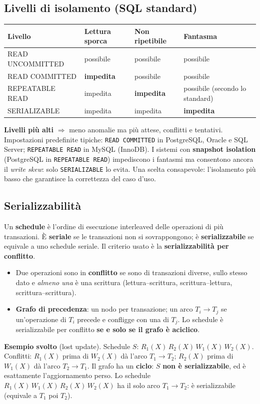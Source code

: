 \subsection{Livelli di isolamento (SQL standard)}
\begin{center}
\small
\begin{tabularx}{\textwidth}{@{}>{\raggedright\arraybackslash}p{3.5cm}XXX@{}}
\toprule
\textbf{Livello} & \textbf{Lettura sporca} & \textbf{Non ripetibile} & \textbf{Fantasma} \\
\midrule
READ UNCOMMITTED & possibile & possibile & possibile \\
READ COMMITTED & \textbf{impedita} & possibile & possibile \\
REPEATABLE READ & impedita & \textbf{impedita} & possibile (secondo lo standard) \\
SERIALIZABLE & impedita & impedita & \textbf{impedita} \\
\bottomrule
\end{tabularx}
\end{center}
\textbf{Livelli più alti} $\Rightarrow$ meno anomalie ma più attese, conflitti e tentativi. Impostazioni predefinite tipiche: \texttt{READ COMMITTED} in PostgreSQL, Oracle e SQL Server; \texttt{REPEATABLE READ} in MySQL (InnoDB). I sistemi con \textbf{snapshot isolation} (PostgreSQL in \texttt{REPEATABLE READ}) impediscono i fantasmi ma consentono ancora il \emph{write skew}: solo \texttt{SERIALIZABLE} lo evita. Una scelta consapevole: l'isolamento più basso che garantisce la correttezza del caso d'uso.

\subsection{Serializzabilità}
Un \textbf{schedule} è l'ordine di esecuzione interleaved delle operazioni di più transazioni. È \textbf{seriale} se le transazioni non si sovrappongono; è \textbf{serializzabile} se equivale a uno schedule seriale. Il criterio usato è la \textbf{serializzabilità per conflitto}.
\begin{itemize}
    \item Due operazioni sono in \textbf{conflitto} se sono di transazioni diverse, sullo stesso dato e \emph{almeno una} è una scrittura (lettura--scrittura, scrittura--lettura, scrittura--scrittura).
    \item \textbf{Grafo di precedenza}: un nodo per transazione; un arco $T_i\to T_j$ se un'operazione di $T_i$ precede e confligge con una di $T_j$. Lo schedule è serializzabile per conflitto \textbf{se e solo se il grafo è aciclico}.
\end{itemize}
\textbf{Esempio svolto} (lost update). Schedule $S$: $R_1(X)\,R_2(X)\,W_1(X)\,W_2(X)$. Conflitti: $R_1(X)$ prima di $W_2(X)$ dà l'arco $T_1\to T_2$; $R_2(X)$ prima di $W_1(X)$ dà l'arco $T_2\to T_1$. Il grafo ha un \textbf{ciclo}: $S$ \textbf{non è serializzabile}, ed è esattamente l'aggiornamento perso. Lo schedule $R_1(X)\,W_1(X)\,R_2(X)\,W_2(X)$ ha il solo arco $T_1\to T_2$: è serializzabile (equivale a $T_1$ poi $T_2$).

